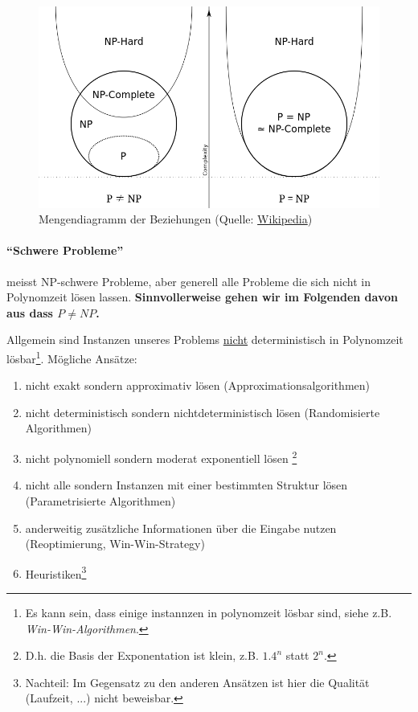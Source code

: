 \begin{figure}[h]
    \centering
    \includegraphics[scale=0.4]{images/np-hard-complete.png}
    \caption{Mengendiagramm der Beziehungen (Quelle: \href{https://commons.wikimedia.org/w/index.php?curid=3532181}{Wikipedia})}
    \label{fig:np-hard-complete}
\end{figure}

\paragraph{``Schwere Probleme''}
meisst NP-schwere Probleme, aber generell alle Probleme die sich nicht in Polynomzeit lösen lassen.
\textbf{Sinnvollerweise gehen wir im Folgenden davon aus dass $P \neq NP$.}

Allgemein sind Instanzen unseres Problems \underline{nicht} deterministisch in Polynomzeit lösbar\footnote{Es kann sein, dass einige instannzen in polynomzeit lösbar sind, siehe z.B. \emph{Win-Win-Algorithmen}.}.
Mögliche Ansätze:
\begin{enumerate}[label=\alph*)]
    \item nicht exakt sondern approximativ lösen (Approximationsalgorithmen)
    \item nicht deterministisch sondern nichtdeterministisch lösen (Randomisierte Algorithmen)
    \item nicht polynomiell sondern moderat exponentiell lösen%
    \footnote{D.h. die Basis der Exponentation ist klein, z.B. $1.4^n$ statt $2^n$.}
    \item nicht alle sondern Instanzen mit einer bestimmten Struktur lösen (Parametrisierte Algorithmen)
    \item anderweitig zusätzliche Informationen über die Eingabe nutzen (Reoptimierung, Win-Win-Strategy)
    \item Heuristiken\footnote{Nachteil: Im Gegensatz zu den anderen Ansätzen ist hier die Qualität (Laufzeit, ...) nicht beweisbar.}
\end{enumerate}


